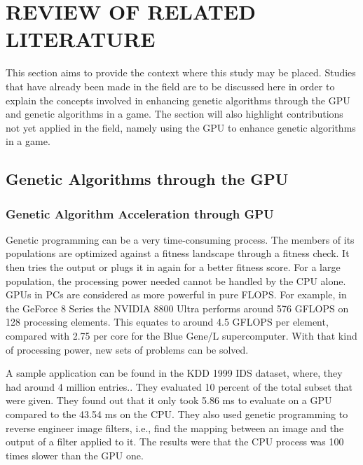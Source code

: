 \chapter{REVIEW OF RELATED LITERATURE}

This section aims to provide the context where this study may be placed. 
Studies that have already been made in the field are to be discussed here in order to 
explain the concepts involved in enhancing genetic algorithms through the GPU and 
genetic algorithms in a game. The section will also highlight contributions not yet 
applied in the field, namely using the GPU to enhance genetic algorithms in a game.


\section{Genetic Algorithms through the GPU}
\subsection{Genetic Algorithm Acceleration through GPU}
Genetic programming can be a very time-consuming process.  The members of its
populations are optimized against a fitness landscape through a fitness check. It
then tries the output or plugs it in again for a better fitness score. For a large
population, the processing power needed cannot be handled by the CPU alone. GPUs in
PCs are considered as more powerful in pure FLOPS\cite{Banzhaf09}.
For example, in the GeForce 8 Series the NVIDIA 8800 Ultra performs around 576 GFLOPS
on 128 processing elements. This equates to around 4.5 GFLOPS per element, compared
with 2.75 per core for the Blue Gene/L supercomputer.  With that kind of processing power, 
new sets of problems can be solved.  

A sample application can be found in the KDD 1999 IDS dataset, where, they had around
4 million entries.\cite{Banzhaf09}. They evaluated 10 percent of the total subset that
were given. They found out that it only took 5.86 ms to evaluate on a GPU compared to
the 43.54 ms on the CPU. They also used genetic programming to reverse engineer image
filters, i.e., find the mapping between an image and the output of a filter applied to 
it. The results were that the CPU process was 100 times slower than the GPU one.  

